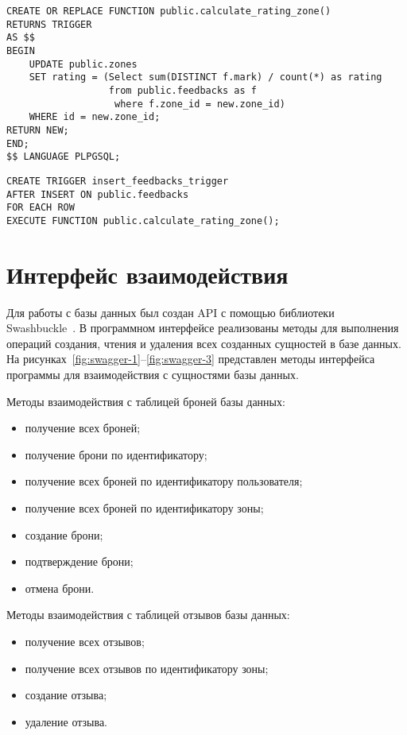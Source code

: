 \begin{center}
	\begin{lstlisting}[label=triggercreate-1, caption=Создание триггера (Часть 1)]
CREATE OR REPLACE FUNCTION public.calculate_rating_zone()
RETURNS TRIGGER
AS $$
BEGIN
	UPDATE public.zones
	SET rating = (Select sum(DISTINCT f.mark) / count(*) as rating 
				  from public.feedbacks as f
				   where f.zone_id = new.zone_id)
	WHERE id = new.zone_id;
RETURN NEW;
END;
$$ LANGUAGE PLPGSQL;
	\end{lstlisting}
\end{center}

\begin{center}
	\begin{lstlisting}[label=triggercreate-2, caption=Создание триггера (Часть 2)]
CREATE TRIGGER insert_feedbacks_trigger
AFTER INSERT ON public.feedbacks
FOR EACH ROW
EXECUTE FUNCTION public.calculate_rating_zone();
	\end{lstlisting}
\end{center}

\section{Интерфейс взаимодействия}

Для работы с базы данных был создан API с помощью библиотеки \\ Swashbuckle~\cite{swagger}. В программном интерфейсе реализованы методы для выполнения операций создания, чтения и удаления всех созданных сущностей в базе данных. На рисунках~\ref{fig:swagger-1}--\ref{fig:swagger-3} представлен методы интерфейса программы для взаимодействия с сущностями базы данных.

Методы взаимодействия с таблицей броней базы данных:
\begin{itemize}
	\item получение всех броней;
	\item получение брони по идентификатору;
	\item получение всех броней по идентификатору пользователя;
	\item получение всех броней по идентификатору зоны;
	\item создание брони;
	\item подтверждение брони;
	\item отмена брони.
\end{itemize}

Методы взаимодействия с таблицей отзывов базы данных:
\begin{itemize}
	\item получение всех отзывов;
	\item получение всех отзывов по идентификатору зоны;
	\item создание отзыва;
	\item удаление отзыва.
\end{itemize}

